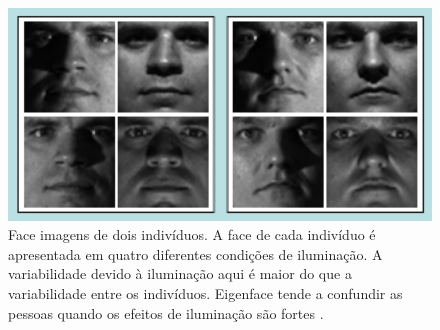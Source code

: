 	\begin{figure}[hbt]
		\begin{center}
			\includegraphics[width=14cm]{figuras/2.FundamentacaoTeorica/exemplosImagensIluminacaoo.png}
		\end{center}
		\caption{Face imagens de dois indivíduos. A face de cada indivíduo é apresentada em quatro diferentes condições de iluminação. A variabilidade devido à iluminação aqui é maior do que a variabilidade entre os indivíduos. Eigenface tende a confundir as pessoas quando os efeitos de iluminação são fortes \cite{hewitt}.}
		\label{exemplosImagensIluminacaoo}
	\end{figure}




